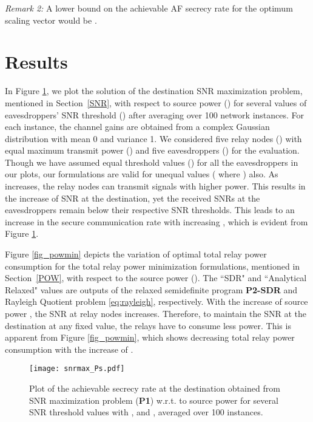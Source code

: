 \documentclass[journal,,draftclsnofoot letterpaper, onecolumn]{IEEEtran}
\begin{document}
\textit{Remark 2:} A lower bound on the achievable AF secrecy rate for the optimum scaling vector would be .

\section{Results}
\label{sec:res}
    In Figure \ref{fig_snrmax}, we plot the solution of the destination SNR maximization problem, mentioned in Section~\ref{SNR}, with respect to source power () for several values of eavesdroppers' SNR threshold () after averaging over 100 network instances. 
For each instance, the channel gains are obtained from a complex Gaussian distribution with mean 0 and variance 1. We considered five relay nodes () with equal maximum transmit power () and five eavesdroppers () for the evaluation. Though we have assumed equal threshold values () for all the eavesdroppers in our plots, our formulations are valid for unequal values ( where ) also.
As  increases, the relay nodes can transmit signals with higher power. This results in the increase of SNR at the destination, yet the received SNRs at the eavesdroppers remain below their respective SNR thresholds. This leads to an increase in the secure communication rate with increasing , which is evident from Figure \ref{fig_snrmax}.


Figure \ref{fig_powmin} depicts the variation of optimal total relay power consumption for the total relay power minimization formulations, mentioned in Section~\ref{POW}, with respect to the source power ().
The ``SDR" and ``Analytical Relaxed" values are outputs of the relaxed semidefinite program \textbf{P2-SDR} and Rayleigh Quotient problem \eqref{eq:rayleigh}, respectively. 
With the increase of source power , the SNR at relay nodes increases. Therefore, to maintain the SNR at the destination at any fixed value, the relays have to consume less power. This is apparent from Figure \ref{fig_powmin}, which shows decreasing total relay power consumption with the increase of . 


\begin{figure}[!t]
\centering
\texttt{[image: snrmax\_Ps.pdf]}
\caption{Plot of the achievable secrecy rate at the destination  obtained from SNR maximization problem (\textbf{P1}) w.r.t. to source power  for several SNR threshold values  with ,  and , averaged over 100 instances.}
\label{fig_snrmax}
\vspace{-0.2in}
\end{figure}
\end{document}
